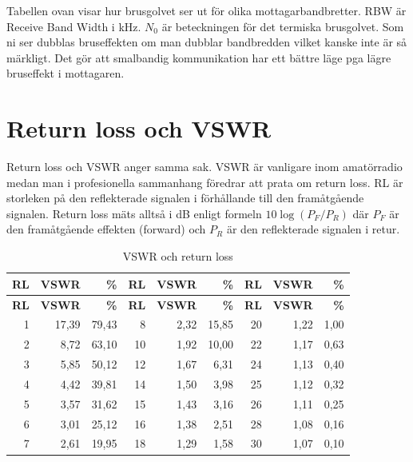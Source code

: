 Tabellen ovan visar hur brusgolvet ser ut för olika mottagarbandbretter. RBW är
Receive Band Width i kHz. $N_0$ är beteckningen för det termiska brusgolvet. Som
ni ser dubblas bruseffekten om man dubblar bandbredden vilket kanske inte är så
märkligt. Det gör att smalbandig kommunikation har ett bättre läge pga lägre
bruseffekt i mottagaren.


\section{Return loss och VSWR}

Return loss och VSWR anger samma sak. VSWR är vanligare inom amatörradio medan
man i profesionella sammanhang föredrar att prata om return loss. RL är
storleken på den reflekterade signalen i förhållande till den framåtgående
signalen. Return loss mäts alltså i dB enligt formeln $10\log(P_F/P_R)$ där
$P_F$ är den framåtgående effekten (forward) och $P_R$ är den reflekterade
signalen i retur.

\begin{longtable}{rrr|rrr|rrr}
	\caption{VSWR och return loss}\\
		\textbf{RL} & \textbf{VSWR} & \textbf{\%} & \textbf{RL} & \textbf{VSWR} & \textbf{\%} & \textbf{RL} & \textbf{VSWR} & \textbf{\%} \\ \hline
	\endfirsthead
	\textbf{RL} & \textbf{VSWR} & \textbf{\%} & \textbf{RL} & \textbf{VSWR} & \textbf{\%} & \textbf{RL} & \textbf{VSWR} & \textbf{\%} \\ \hline 	\endhead
	          1 &         17,39 &       79,43 &           8 &          2,32 &       15,85 &          20 &          1,22 &        1,00 \\
	          2 &          8,72 &       63,10 &          10 &          1,92 &       10,00 &          22 &          1,17 &        0,63 \\
	          3 &          5,85 &       50,12 &          12 &          1,67 &        6,31 &          24 &          1,13 &        0,40 \\
	          4 &          4,42 &       39,81 &          14 &          1,50 &        3,98 &          25 &          1,12 &        0,32 \\
	          5 &          3,57 &       31,62 &          15 &          1,43 &        3,16 &          26 &          1,11 &        0,25 \\
	          6 &          3,01 &       25,12 &          16 &          1,38 &        2,51 &          28 &          1,08 &        0,16 \\
	          7 &          2,61 &       19,95 &          18 &          1,29 &        1,58 &          30 &          1,07 &        0,10
\end{longtable}

